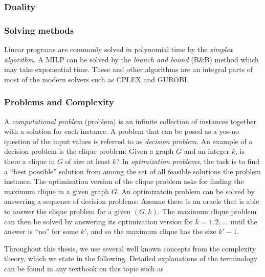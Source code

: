 \subsubsection{Duality}

\subsubsection{Solving methods}

Linear programs are commonly solved in polynomial time by the \emph{simplex algorithm}.
A MILP can be solved by the \emph{branch and bound} (B\&B) method which may take exponential time.
These and other algorithms are an integral parts of most of the modern solvers such as CPLEX and GUROBI.

\subsubsection{Problems and Complexity}\label{sect:probcomp}

A \emph{computational problem} (problem) is an infinite collection of instances together with a solution for each instance.
A problem that can be posed as a yes-no question of the input values is referred to as \emph{decision problem}.
An example of a decision problem is the clique problem: Given a graph $G$ and an integer $k$, is there a clique in $G$ of size at least $k$?
In \emph{optimization problems}, the task is to find a ``best possible'' solution from among the set of all feasible solutions the problem instance.
The optimization version of the clique problem asks for finding the maximum clique in a given graph $G$.
An optimizatoin problem can be solved by answering a sequence of decision problems:
Assume there is an oracle that is able to answer the clique problem for a given $(G,k)$.
The maximum clique problem can then be solved by answering its optimization version for $k=1,2,\dots$ until the answer is ``no'' for some $k'$, and so the maximum clique has the size $k'-1$.

Throughout this thesis, we use several well known concepts from the complexity theory, which we state in the following.
Detailed explanations of the terminology can be found in any textbook on this topic such as \cite{sipser06}.

